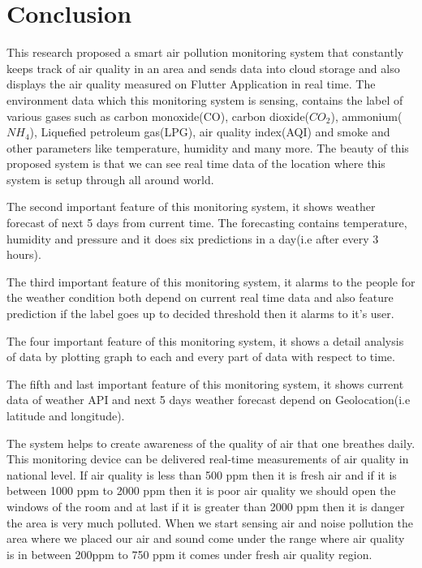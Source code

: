 \chapter{Conclusion} \label{chap5}
\thispagestyle{empty}


\vspace*{40 ex}


This research proposed a smart air pollution monitoring system that constantly keeps track of air quality in an area and sends data into cloud storage and also displays the air quality measured on Flutter Application in real time. The environment data which this monitoring system is sensing, contains the label of various gases such as carbon monoxide(CO), carbon dioxide($CO_{2}$), ammonium($NH_{4}$), Liquefied petroleum gas(LPG), air quality index(AQI) and smoke and other parameters like temperature, humidity and many more. The beauty of this proposed system is that we can see real time data of the location where this system is setup through all around world.

The second important feature of this monitoring system, it shows weather forecast of next 5 days from current time. The forecasting contains temperature, humidity and pressure and it does six predictions in a day(i.e after every 3 hours).

The third important feature of this monitoring system, it alarms to the people for the weather condition both depend on current real time data and also feature prediction if the label goes up to decided threshold then it alarms to it's user.

The four important feature of this monitoring system, it shows a detail analysis of data by plotting graph to each and every part of data with respect to time.

The fifth and last important feature of this monitoring system, it shows current data of weather API and next 5 days weather forecast depend on Geolocation(i.e latitude and longitude).

The system helps to create awareness of the quality of air that one breathes daily. This monitoring device can be delivered real-time measurements of air quality in national level. If air quality is less than 500 ppm then it is fresh air and if it is between 1000 ppm to 2000 ppm then it is poor air quality we should open the windows of the room and at last if it is greater than 2000 ppm then it is danger the area is very much polluted. When we start sensing air and noise pollution the area where we placed our air and sound come under the range where air quality is in between 200ppm to 750 ppm it comes under fresh air quality region.



